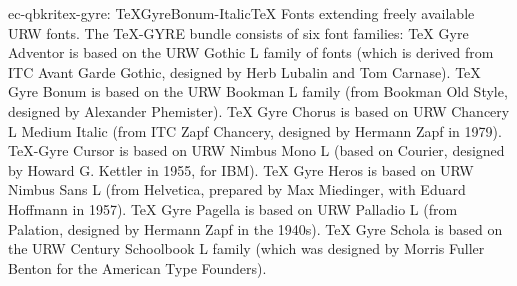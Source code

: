 \documentclass{ddltxtyp}
\begin{document}
\begin{package}{ec-qbkri}{tex-gyre: TeXGyreBonum-Italic}{{\TeX} Fonts extending freely available URW fonts.}
The {\TeX}-GYRE bundle consists of six font families: {\TeX} Gyre
Adventor is based on the URW Gothic L family of fonts (which is
derived from ITC Avant Garde Gothic, designed by Herb Lubalin
and Tom Carnase). {\TeX} Gyre Bonum is based on the URW Bookman L
family (from Bookman Old Style, designed by Alexander
Phemister). {\TeX} Gyre Chorus is based on URW Chancery L Medium
Italic (from ITC Zapf Chancery, designed by Hermann Zapf in
1979). {\TeX}-Gyre Cursor is based on URW Nimbus Mono L (based on
Courier, designed by Howard G. Kettler in 1955, for IBM). {\TeX}
Gyre Heros is based on URW Nimbus Sans L (from Helvetica,
prepared by Max Miedinger, with Eduard Hoffmann in 1957). {\TeX}
Gyre Pagella is based on URW Palladio L (from Palation,
designed by Hermann Zapf in the 1940s). {\TeX} Gyre Schola is
based on the URW Century Schoolbook L family (which was
designed by Morris Fuller Benton for the American Type
Founders). %
\end{package}
\end{document}

